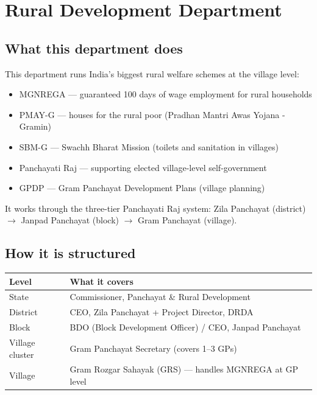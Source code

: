 \documentclass[11pt,a4paper]{article}
\begin{document}
\newpage
\section{Rural Development Department}

\subsection{What this department does}

This department runs India's biggest rural welfare schemes at the village level:
\begin{itemize}[nosep]
  \item MGNREGA --- guaranteed 100 days of wage employment for rural households
  \item PMAY-G --- houses for the rural poor (Pradhan Mantri Awas Yojana - Gramin)
  \item SBM-G --- Swachh Bharat Mission (toilets and sanitation in villages)
  \item Panchayati Raj --- supporting elected village-level self-government
  \item GPDP --- Gram Panchayat Development Plans (village planning)
\end{itemize}

It works through the three-tier Panchayati Raj system: Zila Panchayat (district) $\rightarrow$ Janpad Panchayat (block) $\rightarrow$ Gram Panchayat (village).

\subsection{How it is structured}

\begin{tabularx}{\textwidth}{@{}L{2.5cm} X@{}}
\toprule
\textbf{Level} & \textbf{What it covers} \\
\midrule
State & Commissioner, Panchayat \& Rural Development \\
District & CEO, Zila Panchayat + Project Director, DRDA \\
Block & BDO (Block Development Officer) / CEO, Janpad Panchayat \\
Village cluster & Gram Panchayat Secretary (covers 1--3 GPs) \\
Village & Gram Rozgar Sahayak (GRS) --- handles MGNREGA at GP level \\
\bottomrule
\end{tabularx}
\end{document}
